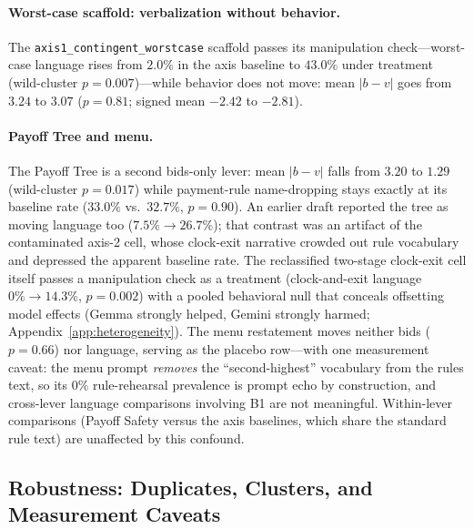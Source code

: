 \paragraph{Worst-case scaffold: verbalization without behavior.} The \texttt{axis1\_contingent\_worstcase} scaffold passes its manipulation check---worst-case language rises from $2.0\%$ in the axis baseline to $43.0\%$ under treatment (wild-cluster $p = 0.007$)---while behavior does not move: mean $|b-v|$ goes from $3.24$ to $3.07$ ($p = 0.81$; signed mean $-2.42$ to $-2.81$).

\paragraph{Payoff Tree and menu.} The Payoff Tree is a second bids-only lever: mean $|b-v|$ falls from $3.20$ to $1.29$ (wild-cluster $p = 0.017$) while payment-rule name-dropping stays exactly at its baseline rate ($33.0\%$ vs.\ $32.7\%$, $p = 0.90$). An earlier draft reported the tree as moving language too ($7.5\% \to 26.7\%$); that contrast was an artifact of the contaminated axis-2 cell, whose clock-exit narrative crowded out rule vocabulary and depressed the apparent baseline rate. The reclassified two-stage clock-exit cell itself passes a manipulation check as a treatment (clock-and-exit language $0\% \to 14.3\%$, $p = 0.002$) with a pooled behavioral null that conceals offsetting model effects (Gemma strongly helped, Gemini strongly harmed; Appendix~\ref{app:heterogeneity}). The menu restatement moves neither bids ($p = 0.66$) nor language, serving as the placebo row---with one measurement caveat: the menu prompt \emph{removes} the ``second-highest'' vocabulary from the rules text, so its $0\%$ rule-rehearsal prevalence is prompt echo by construction, and cross-lever language comparisons involving B1 are not meaningful. Within-lever comparisons (Payoff Safety versus the axis baselines, which share the standard rule text) are unaffected by this confound.

\subsection{Robustness: Duplicates, Clusters, and Measurement Caveats}\label{app:traces-robustness}

